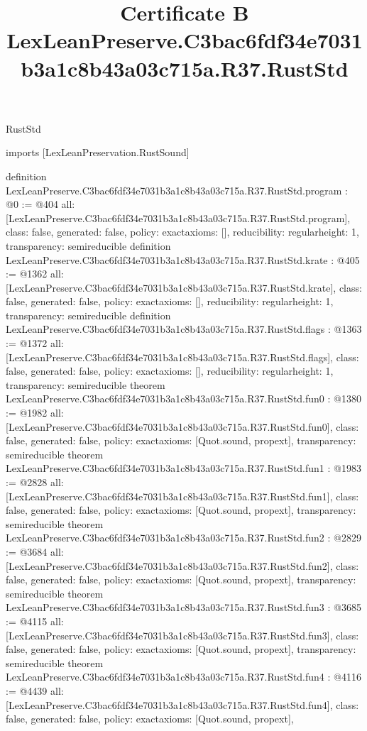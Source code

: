\begin{lexlean}{RustStd}
\title{Certificate B LexLeanPreserve.C3bac6fdf34e7031b3a1c8b43a03c715a.R37.RustStd}
\begin{coremodule}
imports [LexLeanPreservation.RustSound]

definition LexLeanPreserve.C3bac6fdf34e7031b3a1c8b43a03c715a.R37.RustStd.program : @0 := @404 {
  all: [LexLeanPreserve.C3bac6fdf34e7031b3a1c8b43a03c715a.R37.RustStd.program],
  class: false,
  generated: false,
  policy: exact{axioms: []},
  reducibility: regular{height: 1},
  transparency: semireducible
}
definition LexLeanPreserve.C3bac6fdf34e7031b3a1c8b43a03c715a.R37.RustStd.krate : @405 := @1362 {
  all: [LexLeanPreserve.C3bac6fdf34e7031b3a1c8b43a03c715a.R37.RustStd.krate],
  class: false,
  generated: false,
  policy: exact{axioms: []},
  reducibility: regular{height: 1},
  transparency: semireducible
}
definition LexLeanPreserve.C3bac6fdf34e7031b3a1c8b43a03c715a.R37.RustStd.flags : @1363 := @1372 {
  all: [LexLeanPreserve.C3bac6fdf34e7031b3a1c8b43a03c715a.R37.RustStd.flags],
  class: false,
  generated: false,
  policy: exact{axioms: []},
  reducibility: regular{height: 1},
  transparency: semireducible
}
theorem LexLeanPreserve.C3bac6fdf34e7031b3a1c8b43a03c715a.R37.RustStd.fun0 : @1380 := @1982 {
  all: [LexLeanPreserve.C3bac6fdf34e7031b3a1c8b43a03c715a.R37.RustStd.fun0],
  class: false,
  generated: false,
  policy: exact{axioms: [Quot.sound, propext]},
  transparency: semireducible
}
theorem LexLeanPreserve.C3bac6fdf34e7031b3a1c8b43a03c715a.R37.RustStd.fun1 : @1983 := @2828 {
  all: [LexLeanPreserve.C3bac6fdf34e7031b3a1c8b43a03c715a.R37.RustStd.fun1],
  class: false,
  generated: false,
  policy: exact{axioms: [Quot.sound, propext]},
  transparency: semireducible
}
theorem LexLeanPreserve.C3bac6fdf34e7031b3a1c8b43a03c715a.R37.RustStd.fun2 : @2829 := @3684 {
  all: [LexLeanPreserve.C3bac6fdf34e7031b3a1c8b43a03c715a.R37.RustStd.fun2],
  class: false,
  generated: false,
  policy: exact{axioms: [Quot.sound, propext]},
  transparency: semireducible
}
theorem LexLeanPreserve.C3bac6fdf34e7031b3a1c8b43a03c715a.R37.RustStd.fun3 : @3685 := @4115 {
  all: [LexLeanPreserve.C3bac6fdf34e7031b3a1c8b43a03c715a.R37.RustStd.fun3],
  class: false,
  generated: false,
  policy: exact{axioms: [Quot.sound, propext]},
  transparency: semireducible
}
theorem LexLeanPreserve.C3bac6fdf34e7031b3a1c8b43a03c715a.R37.RustStd.fun4 : @4116 := @4439 {
  all: [LexLeanPreserve.C3bac6fdf34e7031b3a1c8b43a03c715a.R37.RustStd.fun4],
  class: false,
  generated: false,
  policy: exact{axioms: [Quot.sound, propext]},
}
\end{coremodule}
\end{lexlean}
